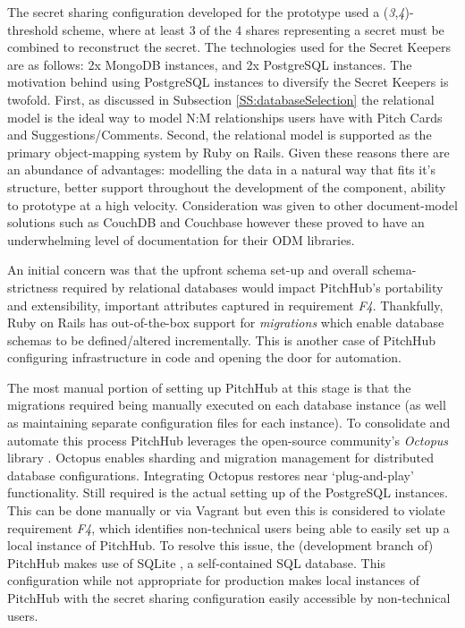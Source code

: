 The secret sharing configuration developed for the prototype used a (\textit{3},\textit{4})-threshold scheme, where at least 3 of the 4 shares representing a secret must be combined to reconstruct the secret. The technologies used for the Secret Keepers are as follows: 2x MongoDB instances, and 2x PostgreSQL instances. The motivation behind using PostgreSQL instances to diversify the Secret Keepers is twofold. First, as discussed in Subsection \ref{SS:databaseSelection} the relational model is the ideal way to model N:M relationships users have with Pitch Cards and Suggestions/Comments. Second, the relational model is supported as the primary object-mapping system by Ruby on Rails. Given these reasons there are an abundance of advantages: modelling the data in a natural way that fits it's structure, better support throughout the development of the component, ability to prototype at a high velocity. Consideration was given to other document-model solutions such as CouchDB \cite{Apach2:online} and Couchbase \cite{Accel4:online} however these proved to have an underwhelming level of documentation for their ODM libraries.
\par
An initial concern was that the upfront schema set-up and overall schema-strictness required by relational databases would impact PitchHub's portability and extensibility, important attributes captured in requirement \textit{F4}. Thankfully, Ruby on Rails has out-of-the-box support for \textit{migrations} which enable database schemas to be defined/altered incrementally. This is another case of PitchHub configuring infrastructure in code and opening the door for automation.
\par
The most manual portion of setting up PitchHub at this stage is that the migrations required being manually executed on each database instance (as well as maintaining separate configuration files for each instance). To consolidate and automate this process PitchHub leverages the open-source community's \textit{Octopus} library \cite{tchan7:online}. Octopus enables sharding and migration management for distributed database configurations. Integrating Octopus restores near `plug-and-play' functionality. Still required is the actual setting up of the PostgreSQL instances. This can be done manually or via Vagrant but even this is considered to violate requirement \textit{F4}, which identifies non-technical users being able to easily set up a local instance of PitchHub. To resolve this issue, the (development branch of) PitchHub makes use of SQLite \cite{SQLit5:online}, a self-contained SQL database. This configuration while not appropriate for production makes local instances of PitchHub with the secret sharing configuration easily accessible by non-technical users.














